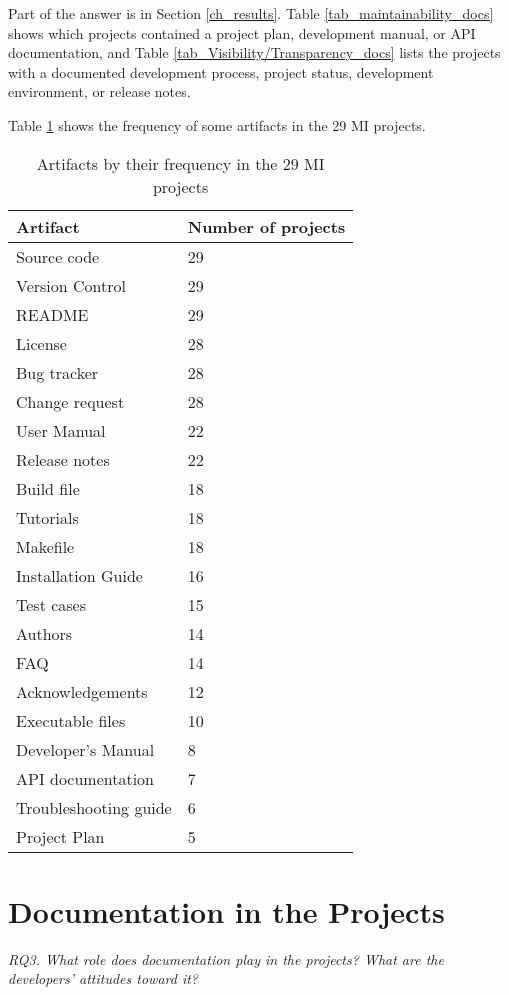Part of the answer is in Section \ref{ch_results}. Table \ref{tab_maintainability_docs} shows which projects contained a project plan, development manual, or API documentation, and Table \ref{tab_Visibility/Transparency_docs} lists the projects with a documented development process, project status, development environment, or release notes.

Table \ref{tab_artifacts_frequency} shows the frequency of some artifacts in the 29 MI projects.

\begin{table}[H]
\centering
\begin{tabular}{ll}
\hline
Artifact & Number of projects \\ \hline
Source code & 29 \\
Version Control & 29 \\
README & 29 \\
License & 28 \\
Bug tracker & 28 \\
Change request & 28 \\
User Manual & 22 \\
Release notes & 22 \\
Build file & 18 \\
Tutorials & 18 \\
Makefile & 18 \\
Installation Guide & 16 \\
Test cases & 15 \\
Authors & 14 \\
FAQ & 14 \\
Acknowledgements & 12 \\
Executable files & 10 \\
Developer's Manual & 8 \\
API documentation & 7 \\
Troubleshooting guide & 6 \\
Project Plan & 5 \\ \hline
\end{tabular}
\caption{\label{tab_artifacts_frequency}Artifacts by their frequency in the 29 MI projects}
\end{table}

\section{Documentation in the Projects}
\label{sec_rq3_documentation}
\textit{RQ3. What role does documentation play in the projects? What are the developers' attitudes toward it?}

